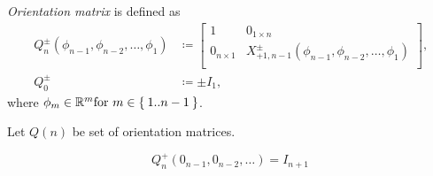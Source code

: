 \documentclass[../main.tex]{subfiles}
\begin{document}
\begin{definition}\label{M:Orientation}
\textit{Orientation matrix} is defined as
\begin{align*}
Q^{\pm}_n\left(\phi_{n-1},\phi_{n-2},\dots,\phi_1\right)
&\coloneqq
\begin{bmatrix}
1&0_{1\times n}\\
0_{n\times 1}&X^{\pm}_{+1,n-1}\left(\phi_{n-1},\phi_{n-2},\dots,\phi_1\right)\\
\end{bmatrix}\text{,}\\
Q^{\pm}_0
&\coloneqq\pm I_1\text{,}
\end{align*}
where $\phi_m\in\mathbb{R}^m\text{for } m\in\Set{1..n-1}$.
\end{definition}
\begin{definition}\label{M:Orientation:Set}
Let $Q\left(n\right)$ be set of orientation matrices.
\end{definition}
\begin{corollary}\label{M:Orientation:Set:Identity}
\begin{equation*}
Q^{+}_{n}
\left(0_{n-1}, 0_{n-2},\dots\right)
=
I_{n+1}
\end{equation*}
\end{corollary}
\end{document}
